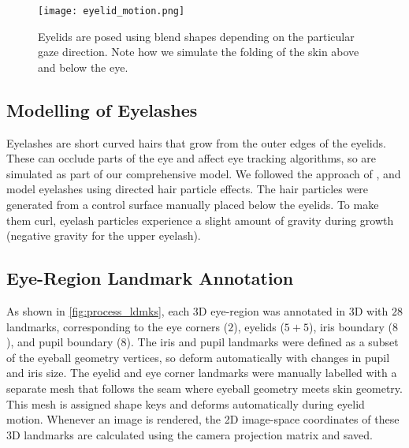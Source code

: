 \begin{figure}
    \texttt{[image: eyelid\_motion.png]}
    \caption{Eyelids are posed using blend shapes depending on the particular gaze direction. Note how we simulate the folding of the skin above and below the eye.}
    \label{fig:eyelids}
\end{figure}

\subsection{Modelling of Eyelashes}

Eyelashes are short curved hairs that grow from the outer edges of the eyelids.
These can occlude parts of the eye and affect eye tracking algorithms, so are simulated as part of our comprehensive model.
We followed the approach of \citet{swirski2014rendering}, and model eyelashes using directed hair particle effects.
The hair particles were generated from a control surface manually placed below the eyelids.
To make them curl, eyelash particles experience a slight amount of gravity during growth (negative gravity for the upper eyelash).

\subsection{Eye-Region Landmark Annotation}

As shown in \autoref{fig:process_ldmks}, each 3D eye-region was annotated in 3D with $28$ landmarks, corresponding to the eye corners ($2$), eyelids ($5\!+\!5$), iris boundary ($8$), and pupil boundary ($8$).
The iris and pupil landmarks were defined as a subset of the eyeball geometry vertices, so deform automatically with changes in pupil and iris size.
The eyelid and eye corner landmarks were manually labelled with a separate mesh that follows the seam where eyeball geometry meets skin geometry.
This mesh is assigned shape keys and deforms automatically during eyelid motion.
%
Whenever an image is rendered, the 2D image-space coordinates of these 3D landmarks are calculated using the camera projection matrix and saved.